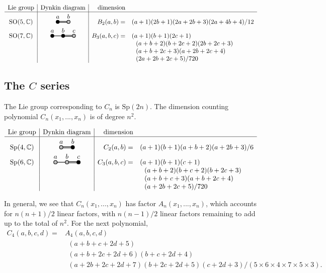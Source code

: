 \documentclass[11pt,oneside]{article}
\newcommand{\Complex}{\mathbb{C}}
\newcommand{\SO}{\mathrm{SO}}
\newcommand{\Sp}{\mathrm{Sp}}
\begin{document}
$$
\begin{array}{c|c|rl}
\text{Lie group} & \text{Dynkin diagram} & \text{dimension} & \\
\hline
\SO(5,\Complex) & \DynkinBab  & B_2(a,b) =& (a+1)(2b+1)(2a+2b+3)(2a+4b+4)/12 \\
\SO(7,\Complex) & \DynkinBabc & B_3(a,b,c) =& (a+1)(b+1)(2c+1) \\
                             & & &\ \ (a+b+2)(b+2c+2)(2b+2c+3) \\
                             & & &\ \ (a+b+2c+3)(a+2b+2c+4) \\
            & & &\ \ (2a+2b+2c+5)/720 \\
\end{array}
$$


\subsection{The $C$ series}

The Lie group corresponding to $C_n$ is $\Sp(2n).$
The dimension counting polynomial $C_n(x_1,...,x_n)$ is
of degree $n^2.$

$$
\begin{array}{c|c|rl}
\text{Lie group} & \text{Dynkin diagram} & \text{dimension} & \\
\hline
\Sp(4,\Complex) & \DynkinCab  & C_2(a,b) =& (a+1)(b+1)(a+b+2)(a+2b+3)/6 \\
\Sp(6,\Complex) & \DynkinCabc & C_3(a,b,c) =& (a+1)(b+1)(c+1) \\
                             & & &\ \ (a+b+2)(b+c+2)(b+2c+3)\\
                             & & &\ \ (a+b+c+3)(a+b+2c+4)\\
            & & &\ \ (a+2b+2c+5)/720 \\
\end{array}
$$

In general, we see that $C_n(x_1,...,x_n)$ has factor $A_n(x_1,...,x_n)$,
which accounts for $n(n+1)/2$ linear factors, with $n(n-1)/2$ linear
factors remaining to add up to the total of $n^2$.
For the next polynomial,
\begin{align*}
C_4(a, b, c, d) =& A_4(a, b, c, d) \\
    &\ \  (a+b+c+2d+5) \\
    &\ \  (a+b+2c+2d+6)(b+c+2d+4) \\
    &\ \  (a+2b+2c+2d+7)(b+2c+2d+5)(c+2d+3)/(5\times 6\times 4\times 7\times 5\times 3).
\end{align*}
\end{document}
